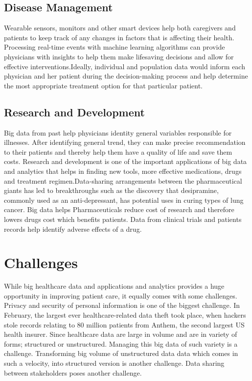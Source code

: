 \documentclass[sigconf]{acmart}
\begin{document}
\subsection{Disease Management} 
Wearable sensors, monitors and other smart devices help both caregivers and patients to keep track of any changes in factors that is affecting their health. Processing real-time events with machine learning algorithms can provide physicians with insights to help them make lifesaving decisions and allow for effective interventions\cite{www-mapr-com}.Ideally, individual and population data would inform each physician and her patient during the decision-making process and help determine the most appropriate treatment option for that particular patient\cite{www-link-springer-com}. 



\subsection{Research and Development}
Big data from past help physicians identity general variables responsible for illnesses. After identifying general trend, they can make precise recommendation to their patients and thereby help them have a quality of life and save them costs. 
Research and development is one of the important applications of big data and
analytics that helps in finding new tools, more effective medications, drugs 
and treatment regimen.Data-sharing arrangements between the pharmaceutical giants has led to breakthroughs such as the discovery that desipramine, commonly used as an anti-depressant, has potential uses in curing types of lung cancer\cite{www-forbes-com}. Big data helps Pharmaceuticals reduce cost of research and therefore lowers drugs cost which benefits patients. Data from clinical trials and patients records help identify adverse effects of a drug.
 
 




\section{Challenges}
While big healthcare data and applications and analytics provides a huge opportunity in improving patient care, it equally comes with some challenges. 
Privacy and security of personal information is one of the biggest challenge.
In February, the largest ever healthcare-related data theft took place, when hackers stole records relating to 80 million patients 
from Anthem, the second largest US health insurer\cite{www-forbes-com}.
Since healthcare data are large in volume and are in variety of forms; structured or unstructured. Managing this big data of such variety is a challenge. Transforming big volume of unstructured data data which comes in such a velocity, into structured version is another challenge. Data sharing between stakeholders poses another challenge.
\end{document}
